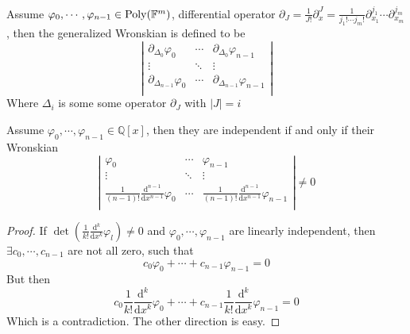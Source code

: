 \begin{definition}\label{definition 32}
Assume $ \varphi_{0}, \cdots, \varphi_{n-1} \in \operatorname{Poly}(\mathbb{F}^{m}) $, differential operator $ \partial_{J} = \frac{1}{J!} \partial_{x}^{J} = \frac{1}{j_{1}!\cdots j_{m}!} \partial_{x_{1}}^{j_{1}}\cdots\partial_{x_{m}}^{j_{m}} $, then the generalized Wronskian is defined to be 
$$
\left|
\begin{array}{ccc}
\partial_{\Delta_{0}}\varphi_{0}    &  \cdots  &  \partial_{\Delta_{0}}\varphi_{n-1}                    \\
              \vdots                &  \ddots  &              \vdots                                    \\
\partial_{\Delta_{n-1}}\varphi_{0}  &  \cdots  &  \partial_{\Delta_{n-1}}\varphi_{n-1}                  \\   
\end{array}
\right|
$$
Where $ \Delta_{i} $ is some some operator $ \partial_{J} $ with $ |J| = i $
\end{definition}

\begin{lemma}\label{lemma 33}
Assume $ \varphi_{0}, \cdots, \varphi_{n-1} \in \mathbb{Q}[x] $, then they are independent if and only if their Wronskian
$$
\left|
\begin{array}{ccc}
                        \varphi_{0}                                     &  \cdots  &                          \varphi_{n-1}                                    \\
                          \vdots                                        &  \ddots  &                            \vdots                                         \\
\frac{1}{(n-1)!}\frac{\mathrm{d}^{n-1}}{\mathrm{d}x^{n-1}}\varphi_{0}  &  \cdots  &  \frac{1}{(n-1)!}\frac{\mathrm{d}^{n-1}}{\mathrm{d}x^{n-1}}\varphi_{n-1} \\   
\end{array}
\right|
\neq0
$$
\end{lemma}

\begin{proof}
If $ \det\left(\frac{1}{k!}\frac{\mathrm{d}^{k}}{\mathrm{d}x^{k}}\varphi_{l}\right) \neq 0 $ and $ \varphi_{0}, \cdots, \varphi_{n-1} $ are linearly independent, then $ \exists c_{0},\cdots,c_{n-1} $ are not all zero, such that 
$$ c_{0}\varphi_{0}+\cdots+c_{n-1}\varphi_{n-1} = 0 $$
But then
$$ c_{0}\frac{1}{k!}\frac{\mathrm{d}^{k}}{\mathrm{d}x^{k}}\varphi_{0}+\cdots+c_{n-1}\frac{1}{k!}\frac{\mathrm{d}^{k}}{\mathrm{d}x^{k}}\varphi_{n-1} = 0 $$
Which is a contradiction. The other direction is easy.
\end{proof}

